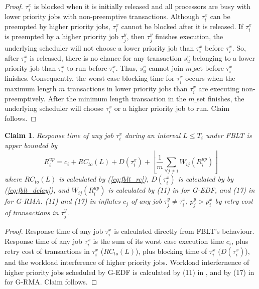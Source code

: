 \documentclass[prodmode,acmtecs]{acmsmall}
\newtheorem{clm}{Claim}
\begin{document}
\begin{compactenum}
\begin{proof}

$\tau_{i}^{x}$ is blocked when it is initially released and all processors
are busy with lower priority jobs with non-preemptive transactions.
Although $\tau_{i}^{x}$ can be preempted by higher priority jobs,
$\tau_{i}^{x}$ cannot be blocked after it is released. If $\tau_{i}^{x}$
is preempted by a higher priority job $\tau_{j}^{y}$, then $\tau_{j}^{y}$
finishes execution, the underlying scheduler will not choose a lower
priority job than $\tau_{i}^{x}$ before $\tau_{i}^{x}$. So, after
$\tau_{i}^{x}$ is released, there is no chance for any transaction
$s_{u}^{v}$ belonging to a lower priority job than $\tau_{i}^{x}$
to run before $\tau_{i}^{x}$. Thus, $s_{u}^{v}$ cannot join $m\_$set
before $\tau_{i}^{x}$ finishes. Consequently, the worst case blocking
time for $\tau_{i}^{x}$ occurs when the maximum length $m$ transactions
in lower priority jobs than $\tau_{i}^{x}$ are executing non-preemptively.
After the minimum length transaction in the $m\_$set finishes, the
underlying scheduler will choose $\tau_{i}^{x}$ or a higher priority
job to run. Claim follows.

\end{proof}

\begin{clm}

Response time of any job $\tau_{i}^{x}$ during an interval $L\le T_{i}$
under FBLT is upper bounded by 
\begin{equation}
R_{i}^{up}=c_{i}+RC_{to}(L)+D(\tau_{i}^{x})+\left\lfloor \frac{1}{m}\sum_{\forall j\ne i}W_{ij}(R_{i}^{up})\right\rfloor \label{eq:fblt_res_time}
\end{equation}
where $RC_{to}(L)$ is calculated by (\ref{eq:fblt_rc}), $D(\tau_{i}^{x})$
is calculated by by (\ref{eq:fblt_delay}), and $W_{ij}(R_{i}^{up})$
is calculated by (11) in \cite{stmconcurrencycontrol:emsoft11} for
G-EDF, and (17) in \cite{stmconcurrencycontrol:emsoft11} for G-RMA.
(11) and (17) in \cite{stmconcurrencycontrol:emsoft11} inflates $c_{j}$
of any job $\tau_{j}^y\ne\tau_{i}^x,\, p_{j}^y>p_{i}^x$ by retry cost
of transactions in $\tau_{j}^y$.

\end{clm}

\begin{proof}

Response time of any job $\tau_i^x$ is calculated directly from FBLT's behaviour. Response time of any job $\tau_{i}^{x}$ is the sum of its
worst case execution time $c_{i}$, plus retry cost of transactions
in $\tau_{i}^{x}$ ($RC_{to}(L)$), plus blocking time of $\tau_{i}^{x}$
($D(\tau_{i}^{x})$), and the workload interference of higher priority
jobs. Workload interfernence of higher priority jobs scheduled by
G-EDF is calculated by (11) in \cite{stmconcurrencycontrol:emsoft11},
and by (17) in \cite{stmconcurrencycontrol:emsoft11} for G-RMA. Claim follows.


\end{proof}
\end{compactenum}
\end{document}
